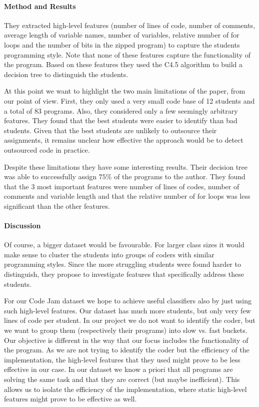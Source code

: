 \paragraph{Method and Results} They extracted high-level features (number of lines of code, number of comments, average length of variable names, number of variables, relative number of for loops and the number of bits in the zipped program) to capture the students programming style. Note that none of these features capture the functionality of the program. Based on these features they used the C4.5 algorithm to build a decision tree to distinguish the students.

At this point we want to highlight the two main limitations of the paper, from our point of view. First, they only used a very small code base of 12 students and a total of 83 programs. Also, they considered only a few seemingly arbitrary features. They found that the best students were easier to identify than bad students. Given that the best students are unlikely to outsource their assignments, it remains unclear how effective the approach would be to detect outsourced code in practice.

Despite these limitations they have some interesting results.
Their decision tree was able to successfully assign $75\%$ of the programs to the author.
They found that the 3 most important features were number of lines of codes, number of comments and variable length and that the relative number of for loops was less significant than the other features.

\paragraph{Discussion}
Of course, a bigger dataset would be favourable. For larger class sizes it would make sense to cluster the students into groups of coders with similar programming styles. Since the more struggling students were found harder to distinguish, they propose to investigate features that specifically address these students.

For our Code Jam dataset we hope to achieve useful classifiers also by just using such high-level features.
Our dataset has much more students, but only very few lines of code per student.
In our project we do not want to identify the coder, but we want to group them (respectively their programs) into slow vs. fast buckets. Our objective is different in the way that our focus includes the functionality of the program. As we are not trying to identify the coder but the efficiency of the implementation, the high-level features that they used might prove to be less effective in our case. In our dataset we know a priori that all programs are solving the same task and that they are correct (but maybe inefficient). This allows us to isolate the efficiency of the implementation, where static high-level features might prove to be effective as well.